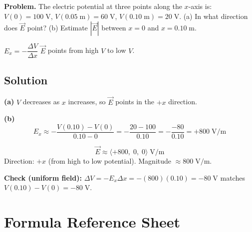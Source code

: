 \documentclass[12pt,letterpaper]{article}
\newcommand{\bvec}[1]{\langle #1 \rangle}   %
\newcommand{\units}[1]{\;\text{#1}}
\begin{document}
\textbf{Problem.} The electric potential at three points along the $x$-axis is:
$V(0) = 100\units{V}$, $V(0.05\units{m}) = 60\units{V}$, $V(0.10\units{m}) = 20\units{V}$.
(a) In what direction does $\vec{E}$ point?
(b) Estimate $|\vec{E}|$ between $x = 0$ and $x = 0.10\units{m}$.

\begin{tcolorbox}[principbox]
$E_x = -\dfrac{\Delta V}{\Delta x}$\qquad
$\vec{E}$ points from high $V$ to low $V$.
\end{tcolorbox}

\subsection*{Solution}

\textbf{(a)} $V$ decreases as $x$ increases, so $\vec{E}$ points in the $+x$ direction.

\textbf{(b)}
\[
  E_x \approx -\frac{V(0.10)-V(0)}{0.10-0} = -\frac{20-100}{0.10} = -\frac{-80}{0.10}
     = +800\units{V/m}
\]

\begin{tcolorbox}[answerbox]
\[
  \vec{E} \approx \bvec{+800,\;0,\;0}\units{V/m}
\]
Direction: $+x$ (from high to low potential). Magnitude $\approx 800\units{V/m}$.
\end{tcolorbox}

\begin{tcolorbox}[checkbox]
\textbf{Check (uniform field):} $\Delta V = -E_x \Delta x = -(800)(0.10) = -80\units{V}$
matches $V(0.10)-V(0) = -80\units{V}$. \checkmark
\end{tcolorbox}

\newpage

\appendix
\section{Formula Reference Sheet}
\label{app:formulas}
\end{document}
